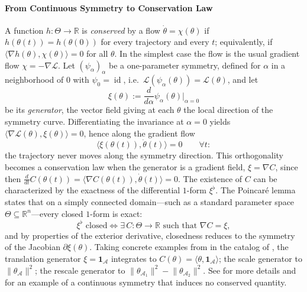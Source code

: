 \documentclass[mathematics,review,submit,moreauthors]{Definitions/mdpi}
\begin{document}
\paragraph{From Continuous Symmetry to Conservation Law}
A function $h:\Theta\to\mathbb{R}$ is \emph{conserved} by a flow $\dot\theta=\chi(\theta)$ if $h(\theta(t))=h(\theta(0))$ for every trajectory and every $t$; equivalently, if $\langle\nabla h(\theta),\chi(\theta)\rangle=0$ for all $\theta$.
In the simplest case the flow is the usual gradient flow $\chi=-\nabla\mathcal{L}$.
Let $(\psi_\alpha)_\alpha$ be a one-parameter symmetry, defined for $\alpha$ in a neighborhood of $0$ with $\psi_0=\operatorname{id}$, i.e.\ $\mathcal{L}(\psi_\alpha(\theta))=\mathcal{L}(\theta)$, and let
\begin{equation*}
    \xi(\theta):=\frac{d}{d\alpha}\psi_\alpha(\theta)\Big\vert_{\alpha=0}
\end{equation*}
be its \emph{generator}, the vector field giving at each $\theta$ the local direction of the symmetry curve.
Differentiating the invariance at $\alpha=0$ yields $\langle\nabla\mathcal{L}(\theta),\xi(\theta)\rangle=0$, hence along the gradient flow
\begin{equation*}
    \langle \xi(\theta(t)), \dot\theta(t)\rangle=0 \qquad \forall t:
\end{equation*}
the trajectory never moves along the symmetry direction.
This orthogonality becomes a conservation law when the generator is a gradient field, $\xi=\nabla C$, since then $\frac{d}{dt}C(\theta(t))=\langle\nabla C(\theta(t)),\dot\theta(t)\rangle=0$.
The existence of $C$ can be characterized by the exactness of the differential $1$-form $\xi^\flat$.
The Poincar\'e lemma states that on a simply connected domain---such as a standard parameter space $\Theta\subseteq\mathbb{R}^n$---every closed $1$-form is exact:
\begin{equation*}
    \xi^\flat \text{ closed} \iff \exists\, C:\Theta\to\mathbb{R} \text{ such that } \nabla C=\xi,
\end{equation*}
and by properties of the exterior derivative, closedness reduces to the symmetry of the Jacobian $\partial\xi(\theta)$.
Taking concrete examples from \citep{kunin2020} in the catalog of , the translation generator $\xi=\boldsymbol{1}_{\mathcal{A}}$ integrates to $C(\theta)=\langle\theta,\boldsymbol{1}_{\mathcal{A}}\rangle$; the scale generator to $\lVert\theta_{\mathcal{A}}\rVert^2$; the rescale generator to $\lVert\theta_{\mathcal{A}_1}\rVert^2-\lVert\theta_{\mathcal{A}_2}\rVert^2$. See \citep{kunin2020,zhao2023a,marcotte2023,ziyin2024a} for more details and \citet[Prop.~52]{gegenfurtner2026} for an example of a continuous symmetry that induces no conserved quantity.
\end{document}

